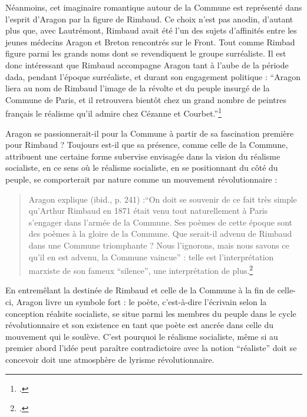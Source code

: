 Néanmoins, cet imaginaire romantique autour de la Commune est représenté dans l'esprit d'Aragon par la figure de Rimbaud. Ce choix n'est pas anodin, d'autant plus que, avec Lautrémont, Rimbaud avait été l'un des sujets d'affinités entre les jeunes médecins Aragon et Breton rencontrés sur le Front. Tout comme Rimbad figure parmi les grands noms dont se revendiquent le groupe surréaliste. Il est donc intéressant que Rimbaud accompagne Aragon tant à l'aube de la période dada, pendant l'époque surréaliste, et durant son engagement politique : \enquote{Aragon liera au nom de Rimbaud l’image de la révolte et du peuple insurgé de la Commune de Paris, et il retrouvera bientôt chez un grand nombre de peintres français le réalisme qu’il admire chez Cézanne et Courbet.}\footcite[p165]{these}

Aragon se passionnerait-il pour la Commune à partir de sa fascination première pour Rimbaud ? Toujours est-il que sa présence, comme celle de la Commune, attribuent une certaine forme subervise envisagée dans la vision du réalisme socialiste, en ce sens où le réalisme socialiste, en se positionnant du côté du peuple, se comporterait par nature comme un mouvement révolutionnaire :

\begin{quote}
Aragon explique (ibid., p. 241) :\enquote{On doit se souvenir de ce fait très simple qu’Arthur Rimbaud en 1871 était venu tout naturellement à Paris s’engager dans l’armée de la Commune. Ses poèmes de cette époque sont des poèmes à la gloire de la Commune. Que serait-il advenu de Rimbaud dans une Commune triomphante ? Nous l’ignorons, mais nous savons ce qu’il en est advenu, la Commune vaincue} : telle est l’interprétation marxiste de son fameux \enquote{silence}, une interprétation de plus.\footcite[p241]{these}	
\end{quote} 

En entremêlant la destinée de Rimbaud et celle de la Commune à la fin de celle-ci, Aragon livre un symbole fort : le poète, c'est-à-dire l'écrivain selon la conception réalsite socialiste, se situe parmi les membres du peuple dans le cycle révolutionnaire et son existence en tant que poète est ancrée dans celle du mouvement qui le soulève. C'est pourquoi le réalisme socialiste, même si au premier abord l'idée peut paraître contradictoire avec la notion \enquote{réaliste} doit se concevoir doit une atmosphère de lyrisme révolutionnaire. 

